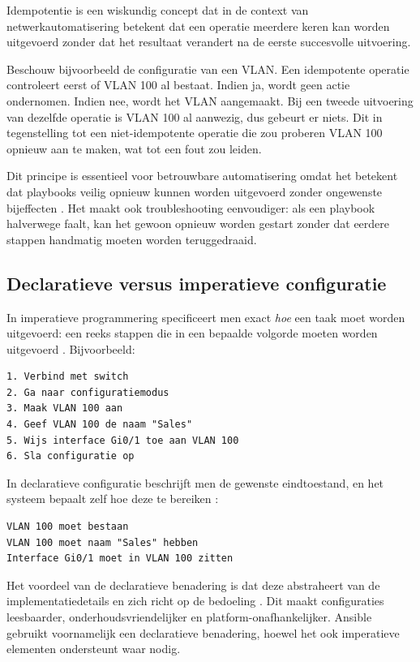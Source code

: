 Idempotentie is een wiskundig concept dat in de context van netwerkautomatisering betekent dat een operatie meerdere keren kan worden uitgevoerd zonder dat het resultaat verandert na de eerste succesvolle uitvoering.

Beschouw bijvoorbeeld de configuratie van een VLAN. 
Een idempotente operatie controleert eerst of VLAN 100 al bestaat. 
Indien ja, wordt geen actie ondernomen. 
Indien nee, wordt het VLAN aangemaakt. 
Bij een tweede uitvoering van dezelfde operatie is VLAN 100 al aanwezig, dus gebeurt er niets.
Dit in tegenstelling tot een niet-idempotente operatie die zou proberen VLAN 100 opnieuw aan te maken, wat tot een fout zou leiden.

Dit principe is essentieel voor betrouwbare automatisering omdat het betekent dat playbooks veilig opnieuw kunnen worden uitgevoerd zonder ongewenste bijeffecten \autocite{Geerling2020AnsibleDevOps}. 
Het maakt ook troubleshooting eenvoudiger: als een playbook halverwege faalt, kan het gewoon opnieuw worden gestart zonder dat eerdere stappen handmatig moeten worden teruggedraaid.

\subsection{Declaratieve versus imperatieve configuratie}
\label{subsec:declaratief-imperatief}

In imperatieve programmering specificeert men exact \emph{hoe} een taak moet worden uitgevoerd: een reeks stappen die in een bepaalde volgorde moeten worden uitgevoerd \autocite{Morris2016InfrastructureAsCode}.
Bijvoorbeeld:
\begin{verbatim}
1. Verbind met switch
2. Ga naar configuratiemodus
3. Maak VLAN 100 aan
4. Geef VLAN 100 de naam "Sales"
5. Wijs interface Gi0/1 toe aan VLAN 100
6. Sla configuratie op
\end{verbatim}

In declaratieve configuratie beschrijft men de gewenste eindtoestand, en het systeem bepaalt zelf hoe deze te bereiken \autocite{Wiggins2018CloudNativeInfrastructure}:
\begin{verbatim}
VLAN 100 moet bestaan
VLAN 100 moet naam "Sales" hebben
Interface Gi0/1 moet in VLAN 100 zitten
\end{verbatim}

Het voordeel van de declaratieve benadering is dat deze abstraheert van de implementatiedetails en zich richt op de bedoeling \autocite{Edelman2018NetworkProgrammability}. 
Dit maakt configuraties leesbaarder, onderhoudsvriendelijker en platform-onafhankelijker.
Ansible gebruikt voornamelijk een declaratieve benadering, hoewel het ook imperatieve elementen ondersteunt waar nodig.

